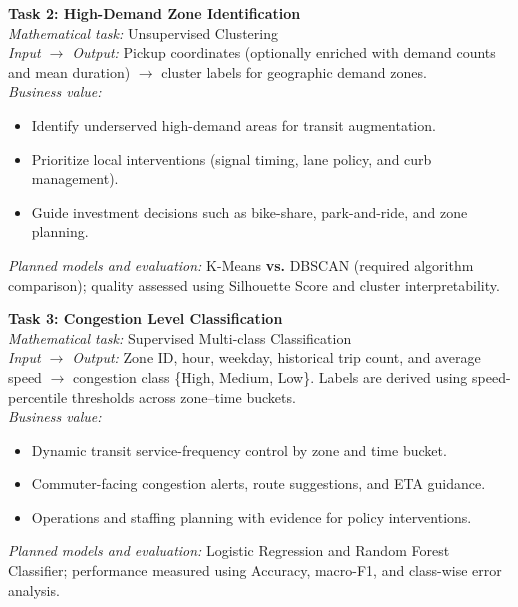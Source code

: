 \documentclass[11pt]{article}
\begin{document}
\textbf{Task 2: High-Demand Zone Identification}\\
\textit{Mathematical task:} Unsupervised Clustering\\
\textit{Input $\rightarrow$ Output:} Pickup coordinates (optionally enriched with demand counts and mean duration) $\rightarrow$ cluster labels for geographic demand zones.\\
\textit{Business value:}
\begin{itemize}[leftmargin=1.3em,itemsep=0pt,topsep=0pt]
    \item Identify underserved high-demand areas for transit augmentation.
    \item Prioritize local interventions (signal timing, lane policy, and curb management).
    \item Guide investment decisions such as bike-share, park-and-ride, and zone planning.
\end{itemize}
\textit{Planned models and evaluation:} K-Means \textbf{vs.} DBSCAN (required algorithm comparison); quality assessed using Silhouette Score and cluster interpretability.

\textbf{Task 3: Congestion Level Classification}\\
\textit{Mathematical task:} Supervised Multi-class Classification\\
\textit{Input $\rightarrow$ Output:} Zone ID, hour, weekday, historical trip count, and average speed $\rightarrow$ congestion class \{High, Medium, Low\}. Labels are derived using speed-percentile thresholds across zone--time buckets.\\
\textit{Business value:}
\begin{itemize}[leftmargin=1.3em,itemsep=0pt,topsep=0pt]
    \item Dynamic transit service-frequency control by zone and time bucket.
    \item Commuter-facing congestion alerts, route suggestions, and ETA guidance.
    \item Operations and staffing planning with evidence for policy interventions.
\end{itemize}
\textit{Planned models and evaluation:} Logistic Regression and Random Forest Classifier; performance measured using Accuracy, macro-F1, and class-wise error analysis.
\end{document}
